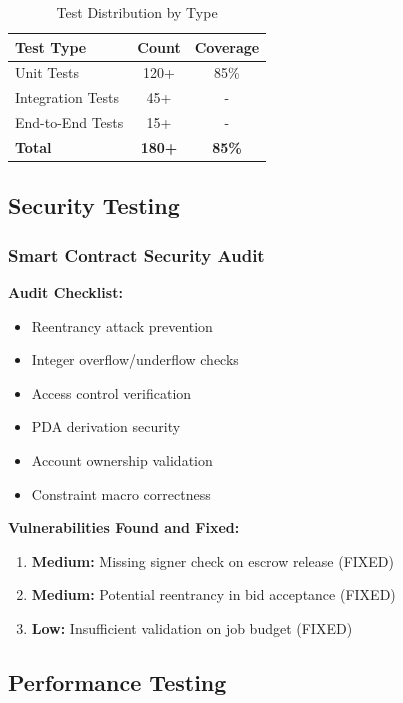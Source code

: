 \documentclass[a4paper,13pt,twoside]{report}
\theoremstyle{definition}
\begin{document}
\begin{table}[h]
\centering
\caption{Test Distribution by Type}
\begin{tabular}{|l|c|c|}
\hline
\textbf{Test Type} & \textbf{Count} & \textbf{Coverage} \\
\hline
Unit Tests & 120+ & 85\% \\
Integration Tests & 45+ & - \\
End-to-End Tests & 15+ & - \\
\hline
\textbf{Total} & \textbf{180+} & \textbf{85\%} \\
\hline
\end{tabular}
\end{table}

\subsection{Security Testing}

\subsubsection{Smart Contract Security Audit}

\textbf{Audit Checklist:}
\begin{itemize}
    \item Reentrancy attack prevention
    \item Integer overflow/underflow checks
    \item Access control verification
    \item PDA derivation security
    \item Account ownership validation
    \item Constraint macro correctness
\end{itemize}

\textbf{Vulnerabilities Found and Fixed:}
\begin{enumerate}
    \item \textbf{Medium:} Missing signer check on escrow release (FIXED)
    \item \textbf{Medium:} Potential reentrancy in bid acceptance (FIXED)
    \item \textbf{Low:} Insufficient validation on job budget (FIXED)
\end{enumerate}

\subsection{Performance Testing}
\end{document}
